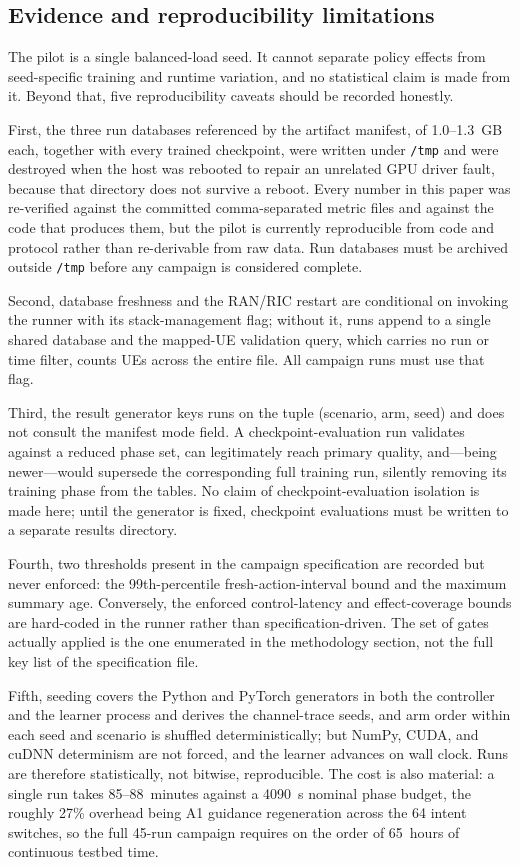 \subsection{Evidence and reproducibility limitations}
The pilot is a single balanced-load seed. It cannot separate policy effects from seed-specific training and runtime variation, and no statistical claim is made from it. Beyond that, five reproducibility caveats should be recorded honestly.

First, the three run databases referenced by the artifact manifest, of 1.0--1.3~GB each, together with every trained checkpoint, were written under \texttt{/tmp} and were destroyed when the host was rebooted to repair an unrelated GPU driver fault, because that directory does not survive a reboot. Every number in this paper was re-verified against the committed comma-separated metric files and against the code that produces them, but the pilot is currently reproducible from code and protocol rather than re-derivable from raw data. Run databases must be archived outside \texttt{/tmp} before any campaign is considered complete.

Second, database freshness and the RAN/RIC restart are conditional on invoking the runner with its stack-management flag; without it, runs append to a single shared database and the mapped-UE validation query, which carries no run or time filter, counts UEs across the entire file. All campaign runs must use that flag.

Third, the result generator keys runs on the tuple (scenario, arm, seed) and does not consult the manifest mode field. A checkpoint-evaluation run validates against a reduced phase set, can legitimately reach primary quality, and---being newer---would supersede the corresponding full training run, silently removing its training phase from the tables. No claim of checkpoint-evaluation isolation is made here; until the generator is fixed, checkpoint evaluations must be written to a separate results directory.

Fourth, two thresholds present in the campaign specification are recorded but never enforced: the 99th-percentile fresh-action-interval bound and the maximum summary age. Conversely, the enforced control-latency and effect-coverage bounds are hard-coded in the runner rather than specification-driven. The set of gates actually applied is the one enumerated in the methodology section, not the full key list of the specification file.

Fifth, seeding covers the Python and PyTorch generators in both the controller and the learner process and derives the channel-trace seeds, and arm order within each seed and scenario is shuffled deterministically; but NumPy, CUDA, and cuDNN determinism are not forced, and the learner advances on wall clock. Runs are therefore statistically, not bitwise, reproducible. The cost is also material: a single run takes 85--88~minutes against a 4090~s nominal phase budget, the roughly 27\% overhead being A1 guidance regeneration across the 64 intent switches, so the full 45-run campaign requires on the order of 65~hours of continuous testbed time.

